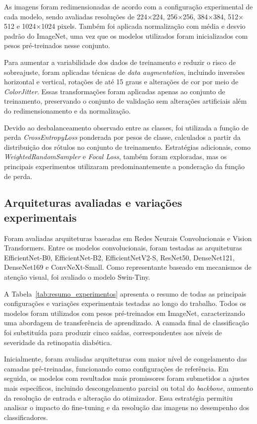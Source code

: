 \documentclass[conference]{IEEEtran}
\begin{document}
As imagens foram redimensionadas de acordo com a configuração
experimental de cada modelo, sendo avaliadas resoluções de
224$\times$224, 256$\times$256, 384$\times$384, 512$\times$512 e
1024$\times$1024 pixels. Também foi aplicada normalização com
média e desvio padrão do ImageNet, uma vez que os modelos utilizados
foram inicializados com pesos pré-treinados nesse conjunto.

Para aumentar a variabilidade dos dados de treinamento e reduzir o risco
de sobreajuste, foram aplicadas técnicas de \textit{data augmentation},
incluindo inversões horizontal e vertical, rotações de até
15 graus e alterações de cor por meio de \textit{ColorJitter}.
Essas transformações foram aplicadas apenas ao conjunto de
treinamento, preservando o conjunto de validação sem alterações
artificiais além do redimensionamento e da normalização.

Devido ao desbalanceamento observado entre as classes, foi utilizada a
função de perda \textit{CrossEntropyLoss} ponderada por pesos de
classe, calculados a partir da distribuição dos rótulos no
conjunto de treinamento. Estratégias adicionais, como
\textit{WeightedRandomSampler} e \textit{Focal Loss}, também foram
exploradas, mas os principais experimentos utilizaram predominantemente
a ponderação da função de perda.

\subsection{Arquiteturas avaliadas e variações experimentais}

Foram avaliadas arquiteturas baseadas em Redes Neurais Convolucionais e
Vision Transformers. Entre os modelos convolucionais, foram testadas as
arquiteturas EfficientNet-B0, EfficientNet-B2, EfficientNetV2-S,
ResNet50, DenseNet121, DenseNet169 e ConvNeXt-Small. Como representante
baseado em mecanismos de atenção visual, foi avaliado o modelo
Swin-Tiny.

A Tabela~\ref{tab:resumo_experimentos} apresenta o resumo de todas as principais configurações e variações experimentais testadas ao longo do trabalho. Todos os modelos foram utilizados com pesos pré-treinados em ImageNet, caracterizando uma abordagem de transferência de aprendizado. A camada final de classificação foi substituída para produzir cinco saídas, correspondentes aos níveis de severidade da retinopatia diabética.

Inicialmente, foram avaliadas arquiteturas com maior nível de congelamento das camadas pré-treinadas, funcionando como configurações de referência. Em seguida, os modelos com resultados mais promissores foram submetidos a ajustes mais específicos, incluindo descongelamento parcial ou total do \textit{backbone}, aumento da resolução de entrada e alteração do otimizador. Essa estratégia permitiu analisar o impacto do fine-tuning e da resolução das imagens no desempenho dos classificadores.
\end{document}
